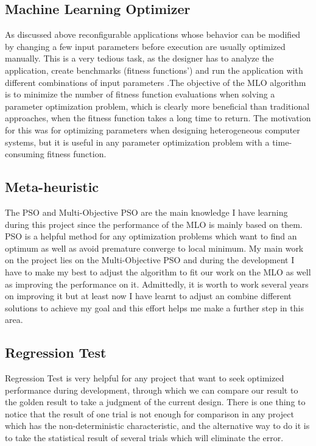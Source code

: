 \documentclass[12pt, runningheads,a4paper]{llncs}
\begin{document}
\subsection{Machine Learning Optimizer}
As discussed above reconfigurable applications whose behavior can be modified by changing a few input parameters before execution are usually optimized manually. This is a very tedious task, as the designer has to analyze the application, create benchmarks (fitness functions') and run the application with different combinations of input parameters .The objective of the MLO algorithm is to minimize the number of fitness function evaluations when solving a parameter optimization problem, which is clearly more beneficial than traditional approaches, when the fitness function takes a long time to return. The motivation for this was for optimizing parameters when designing heterogeneous computer systems, but it is useful in any parameter optimization problem with a time-consuming fitness function.

\subsection{Meta-heuristic}
The PSO and Multi-Objective PSO are the main knowledge I have learning during this project since the performance of the MLO is mainly based on them. PSO is a helpful method for any optimization problems which want to find an optimum as well as avoid premature converge to local minimum. My main work on the project lies on the Multi-Objective PSO and during the development I have to make my best to adjust the algorithm to fit our work on the MLO as well as improving the performance on it. Admittedly, it is worth to work several years on improving it but at least now I have learnt to adjust an combine different solutions to achieve my goal and this effort helps me make a further step in this area.

\subsection{Regression Test}
Regression Test is very helpful for any project that want to seek optimized performance during development, through which we can compare our result to the golden result to take a judgment of the current design. There is one thing to notice that the result of one trial is not enough for comparison in any project which has the non-deterministic characteristic, and the alternative way to do it is to take the statistical result of several trials which will eliminate the error.
\end{document}
